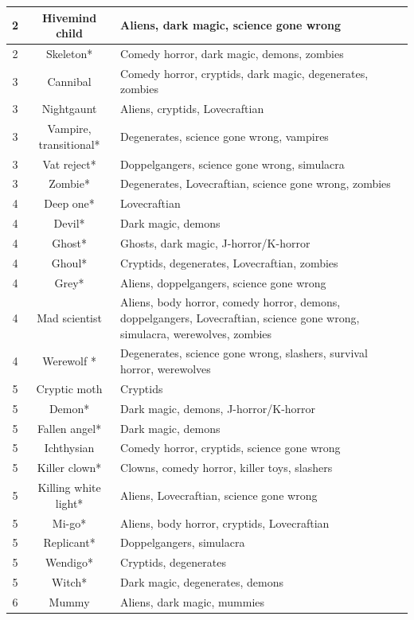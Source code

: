 \begin{longtable}{|c|c|p{10cm}|}
2 & Hivemind child & Aliens, dark magic, science gone wrong \\ \hline
2 & Skeleton* & Comedy horror, dark magic, demons, zombies \\ \hline
3 & Cannibal & Comedy horror, cryptids, dark magic, degenerates, zombies \\ \hline
3 & Nightgaunt & Aliens, cryptids, Lovecraftian \\ \hline
3 & Vampire, transitional* & Degenerates, science gone wrong, vampires \\ \hline
3 & Vat reject* & Doppelgangers, science gone wrong, simulacra \\ \hline
3 & Zombie* & Degenerates, Lovecraftian, science gone wrong, zombies \\ \hline
4 & Deep one* & Lovecraftian \\ \hline
4 & Devil* & Dark magic, demons \\ \hline
4 & Ghost* & Ghosts, dark magic, J-horror/K-horror \\ \hline
4 & Ghoul* & Cryptids, degenerates, Lovecraftian, zombies \\ \hline
4 & Grey* & Aliens, doppelgangers, science gone wrong \\ \hline
4 & Mad scientist & Aliens, body horror, comedy horror, demons, doppelgangers, Lovecraftian, science gone wrong, simulacra, werewolves, zombies \\ \hline
4 & Werewolf * & Degenerates, science gone wrong, slashers, survival horror, werewolves \\ \hline
5 & Cryptic moth & Cryptids \\ \hline
5 & Demon* & Dark magic, demons, J-horror/K-horror \\ \hline
5 & Fallen angel* & Dark magic, demons \\ \hline
5 & Ichthysian & Comedy horror, cryptids, science gone wrong \\ \hline
5 & Killer clown* & Clowns, comedy horror, killer toys, slashers \\ \hline
5 & Killing white light* & Aliens, Lovecraftian, science gone wrong \\ \hline
5 & Mi-go* & Aliens, body horror, cryptids, Lovecraftian \\ \hline
5 & Replicant* & Doppelgangers, simulacra \\ \hline
5 & Wendigo* & Cryptids, degenerates \\ \hline
5 & Witch* & Dark magic, degenerates, demons \\ \hline
6 & Mummy & Aliens, dark magic, mummies \\ \hline

\end{longtable}
